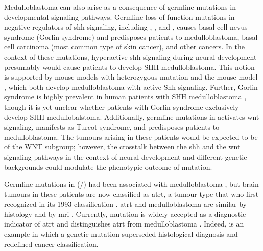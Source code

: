 Medulloblastoma can also arise as a consequence of germline mutations in developmental signaling pathways. Germline loss-of-function mutations in negative regulators of \gls{shh} signaling, including , , and , causes basal cell nevus syndrome (Gorlin syndrome) and predisposes patients to medulloblastoma, basal cell carcinoma (most common type of skin cancer), and other cancers. In the context of these mutations, hyperactive \gls{shh} signaling during neural development presumably would cause patients to develop SHH medulloblastoma. This notion is supported by mouse models with heterozygous  mutation  and the \high{+/-} \high{-/-} mouse model , which both develop medulloblastoma with active Shh signaling. Further, Gorlin syndrome is highly prevalent in human patients with SHH medulloblastoma , though it is yet unclear whether patients with Gorlin syndrome exclusively develop SHH medullobalstoma. Additionally, germline mutations in  activates \gls{wnt} signaling, manifests as Turcot syndrome, and predisposes patients to medulloblastoma. The tumours arising in these patients would be expected to be of the WNT subgroup; however, the crosstalk between the \gls{shh} and the \gls{wnt} signaling pathways in the context of neural development and different genetic backgrounds could modulate the phenotypic outcome of  mutation.

Germline mutations in  (/) had been associated with medulloblastoma , but brain tumours in these patients are now classified as \gls{atrt}, a tumour type that \gls{who} first recognized in its 1993 classification . \gls{atrt} and medulloblastoma are similar by histology and by \gls{mri} . Currently,  mutation is widely accepted as a diagnostic indicator of \gls{atrt} and distinguishes \gls{atrt} from medulloblastoma . Indeed,  is an example in which a genetic mutation superseded histological diagnosis and redefined cancer classification.

